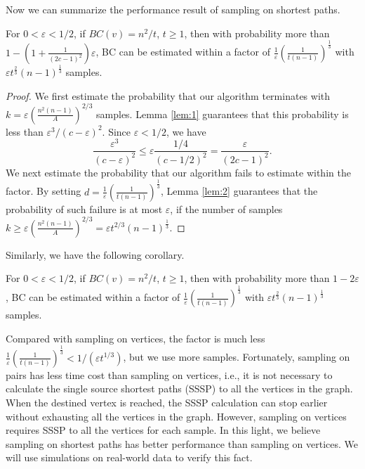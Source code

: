 \documentclass[10pt]{article}
\begin{document}
Now we can summarize the performance result of sampling on shortest paths.

\begin{theorem}
\label{thm:main2}
For $0<\varepsilon < 1/2$, if $BC(v) = n^2/t$, $t\geq 1$, then with probability more than $1-\left(1+\frac{1}{(2c-1)^2}\right)\varepsilon$, BC can be estimated within a factor of $\frac{1}{\varepsilon}\left(\frac{1}{t(n-1)}\right)^{\frac{1}{3}}$ with $\varepsilon t^{\frac{2}{3}}(n-1)^{\frac{1}{3}}$ samples.
\end{theorem}
\begin{proof}
We first estimate the probability that our algorithm terminates with $k=\varepsilon (\frac{n^2(n-1)}{A})^{2/3}$ samples. Lemma \ref{lem:1} guarantees that this probability is less than $\varepsilon^3/(c-\varepsilon)^2$. Since $\varepsilon < 1/2$, we have
$$\frac{\varepsilon^3}{(c-\varepsilon)^2} \leq \varepsilon \frac{1/4}{(c-1/2)^2}=\frac{\varepsilon}{(2c-1)^2}.$$
We next estimate the probability that our algorithm fails to estimate within the factor. By setting $d=\frac{1}{\varepsilon}\left(\frac{1}{t(n-1)}\right)^{\frac{1}{3}}$, Lemma \ref{lem:2} guarantees that the probability of such failure is at most $\varepsilon$, if the number of samples $k\geq \varepsilon (\frac{n^2(n-1)}{A})^{2/3}=\varepsilon t^{2/3}(n-1)^{\frac{1}{3}}$.
\end{proof}

Similarly, we have the following corollary.
\begin{corollary}
For $0<\varepsilon < 1/2$, if $BC(v) = n^2/t$, $t\geq 1$, then with probability more than $1-2\varepsilon$, BC can be estimated within a factor of $\frac{1}{\varepsilon}\left(\frac{1}{t(n-1)}\right)^{\frac{1}{3}}$ with $\varepsilon t^{\frac{2}{3}}(n-1)^{\frac{1}{3}}$ samples.
\end{corollary}
Compared with sampling on vertices, the factor is much less $\frac{1}{\varepsilon}\left(\frac{1}{t(n-1)}\right)^{\frac{1}{3}} < 1/(\varepsilon t^{1/3})$, but we use more samples. Fortunately, sampling on pairs has less time cost than sampling on vertices, i.e., it is not necessary to calculate the single source shortest paths (SSSP) to all the vertices in the graph. When the destined vertex is reached, the SSSP calculation can stop earlier without exhausting all the vertices in the graph. However, sampling on vertices requires SSSP to all the vertices for each sample. In this light, we believe sampling on shortest paths has better performance than sampling on vertices. We will use simulations on real-world data to verify this fact.
\end{document}
